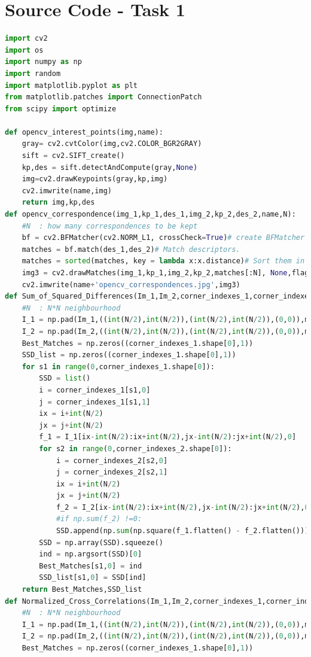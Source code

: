 \documentclass{article}
\begin{document}
\newpage
\section{Source Code - Task 1}
\begin{lstlisting}[language=Python]
import cv2
import os
import numpy as np
import random
import matplotlib.pyplot as plt
from matplotlib.patches import ConnectionPatch
from scipy import optimize

def opencv_interest_points(img,name):
	gray= cv2.cvtColor(img,cv2.COLOR_BGR2GRAY)
	sift = cv2.SIFT_create()
	kp,des = sift.detectAndCompute(gray,None)
	img=cv2.drawKeypoints(gray,kp,img)
	cv2.imwrite(name,img)
	return img,kp,des
def opencv_correspondence(img_1,kp_1,des_1,img_2,kp_2,des_2,name,N):
	#N 	: how many correspondences to be kept
	bf = cv2.BFMatcher(cv2.NORM_L1, crossCheck=True)# create BFMatcher object
	matches = bf.match(des_1,des_2)# Match descriptors.
	matches = sorted(matches, key = lambda x:x.distance)# Sort them in the order of their distance.
	img3 = cv2.drawMatches(img_1,kp_1,img_2,kp_2,matches[:N], None,flags=2)# Draw first 10 matches.
	cv2.imwrite(name+'opencv_correspondences.jpg',img3)
def Sum_of_Squared_Differences(Im_1,Im_2,corner_indexes_1,corner_indexes_2,N,padding_mode='constant'):
	#N	: N*N neighbourhood
	I_1 = np.pad(Im_1,((int(N/2),int(N/2)),(int(N/2),int(N/2)),(0,0)),mode=padding_mode)
	I_2 = np.pad(Im_2,((int(N/2),int(N/2)),(int(N/2),int(N/2)),(0,0)),mode=padding_mode)
	Best_Matches = np.zeros((corner_indexes_1.shape[0],1))
	SSD_list = np.zeros((corner_indexes_1.shape[0],1))
	for s1 in range(0,corner_indexes_1.shape[0]):
		SSD = list()
		i = corner_indexes_1[s1,0]
		j = corner_indexes_1[s1,1]
		ix = i+int(N/2)
		jx = j+int(N/2)
		f_1 = I_1[ix-int(N/2):ix+int(N/2),jx-int(N/2):jx+int(N/2),0]
		for s2 in range(0,corner_indexes_2.shape[0]):
			i = corner_indexes_2[s2,0]
			j = corner_indexes_2[s2,1]
			ix = i+int(N/2)
			jx = j+int(N/2)
			f_2 = I_2[ix-int(N/2):ix+int(N/2),jx-int(N/2):jx+int(N/2),0]
			#if np.sum(f_2) !=0:
			SSD.append(np.sum(np.square(f_1.flatten() - f_2.flatten())))
		SSD = np.array(SSD).squeeze()
		ind = np.argsort(SSD)[0]
		Best_Matches[s1,0] = ind
		SSD_list[s1,0] = SSD[ind]
	return Best_Matches,SSD_list
def Normalized_Cross_Correlations(Im_1,Im_2,corner_indexes_1,corner_indexes_2,N,padding_mode='constant'):
	#N	: N*N neighbourhood
	I_1 = np.pad(Im_1,((int(N/2),int(N/2)),(int(N/2),int(N/2)),(0,0)),mode=padding_mode)
	I_2 = np.pad(Im_2,((int(N/2),int(N/2)),(int(N/2),int(N/2)),(0,0)),mode=padding_mode)
	Best_Matches = np.zeros((corner_indexes_1.shape[0],1))

\end{lstlisting}
\end{document}
